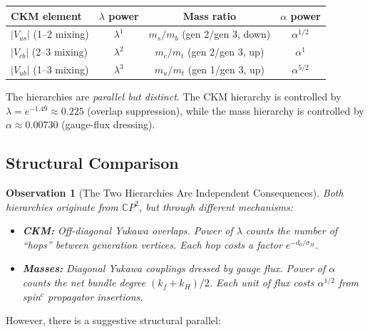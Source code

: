 \documentclass[11pt]{article}
\newcommand{\CP}{\mathbb{C}P}
\newtheorem{observation}[theorem]{Observation}
\theoremstyle{remark}
\begin{document}
\begin{center}
\begin{tabular}{lccc}
\toprule
\textbf{CKM element} & \textbf{$\lambda$ power} &
\textbf{Mass ratio} & \textbf{$\alpha$ power} \\
\midrule
$|V_{us}|$ (1--2 mixing) & $\lambda^1$ &
$m_s/m_b$ (gen 2/gen 3, down) & $\alpha^{1/2}$ \\
$|V_{cb}|$ (2--3 mixing) & $\lambda^2$ &
$m_c/m_t$ (gen 2/gen 3, up) & $\alpha^{1}$ \\
$|V_{ub}|$ (1--3 mixing) & $\lambda^3$ &
$m_u/m_t$ (gen 1/gen 3, up) & $\alpha^{5/2}$ \\
\bottomrule
\end{tabular}
\end{center}

The hierarchies are \emph{parallel but distinct}. The CKM hierarchy
is controlled by $\lambda = e^{-1.49} \approx 0.225$ (overlap
suppression), while the mass hierarchy is controlled by
$\alpha \approx 0.00730$ (gauge-flux dressing).

\subsection{Structural Comparison}

\begin{observation}[The Two Hierarchies Are Independent Consequences]
\label{obs:hierarchies}
Both hierarchies originate from $\CP^2$, but through different mechanisms:
\begin{itemize}
\item \textbf{CKM:} Off-diagonal Yukawa overlaps.
  Power of $\lambda$ counts the number of ``hops'' between generation
  vertices. Each hop costs a factor $e^{-d_0/\sigma_H}$.
\item \textbf{Masses:} Diagonal Yukawa couplings dressed by gauge flux.
  Power of $\alpha$ counts the net bundle degree $(k_f + k_H)/2$.
  Each unit of flux costs $\alpha^{1/2}$ from spin$^c$ propagator insertions.
\end{itemize}
\end{observation}

However, there is a suggestive structural parallel:
\end{document}
